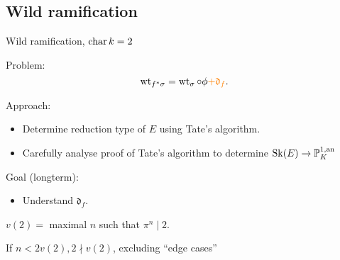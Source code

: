 \subsection{Wild ramification} \label{sec:wild_ramification}

\begin{frame}
	{Wild ramification, $\operatorname{char} k = 2$}

	Problem: \[
		\operatorname{wt}_{f^*\sigma} = \operatorname{wt}_{\sigma} \circ \phi {\color{orange} +  \mathfrak{d} _f}
	.\] 
	\medskip

	\pause

	Approach:
	\begin{itemize}
		\item Determine reduction type of $E $ using Tate's algorithm.
		\item Carefully analyse proof of Tate's algorithm to determine $\operatorname{Sk}(E) \to \mathbb P^{1, \text{an}}_{K}$
	\end{itemize}
	\pause 
	\bigskip

	Goal (longterm):
	\begin{itemize}
		\item Understand $\mathfrak{d} _f$.
	\end{itemize}
\end{frame}
\begin{frame}
	$v(2) =$ maximal $n$ such that $\pi^{n} \mid 2$.  

\begin{figure}[ht]
    \centering
\end{figure}

\end{frame}
\begin{frame}
	If $n < 2v(2), 2 \nmid v(2)$, excluding ``edge cases''
\begin{figure}[ht]
    \centering
\end{figure}
\end{frame}
